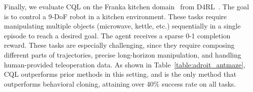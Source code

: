 
Finally, we evaluate CQL on the Franka kitchen domain~\citep{gupta2019relay} from D4RL~\citep{d4rl_repo}.
The goal is to control a 9-DoF robot in a kitchen environment. These tasks require manipulating multiple objects (microwave, kettle, etc.) sequentially in a single episode to reach a desired goal. The agent receives a sparse 0-1 completion reward. These tasks are especially challenging, since they require composing different parts of trajectories, precise long-horizon manipulation, and handling human-provided teleoperation data. As shown in Table~\ref{table:adroit_antmaze}, CQL outperforms prior methods in this setting, and is the only method that outperforms behavioral cloning, attaining over 40\% success rate on all tasks.



